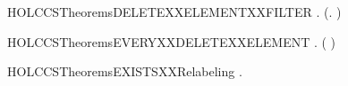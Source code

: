 \newcommand{\HOLCCSTheoremsDELETEXXELEMENTXXAPPEND}{\UseVerbatim{HOLCCSTheoremsDELETEXXELEMENTXXAPPEND}}
\begin{SaveVerbatim}{HOLCCSTheoremsDELETEXXELEMENTXXFILTER}
\HOLTokenTurnstile{} \HOLSymConst{\HOLTokenForall{}} .    \HOLSymConst{=}  (\HOLTokenLambda{}.  \HOLSymConst{\HOLTokenNotEqual{}} ) 
\end{SaveVerbatim}
\newcommand{\HOLCCSTheoremsDELETEXXELEMENTXXFILTER}{\UseVerbatim{HOLCCSTheoremsDELETEXXELEMENTXXFILTER}}
\begin{SaveVerbatim}{HOLCCSTheoremsEVERYXXDELETEXXELEMENT}
\HOLTokenTurnstile{} \HOLSymConst{\HOLTokenForall{}}  .   \HOLSymConst{\HOLTokenConj{}}   (  ) \HOLSymConst{\HOLTokenImp{}}   
\end{SaveVerbatim}
\newcommand{\HOLCCSTheoremsEVERYXXDELETEXXELEMENT}{\UseVerbatim{HOLCCSTheoremsEVERYXXDELETEXXELEMENT}}
\begin{SaveVerbatim}{HOLCCSTheoremsEXISTSXXRelabeling}
\HOLTokenTurnstile{} \HOLSymConst{\HOLTokenExists{}}.  
\end{SaveVerbatim}
\newcommand{\HOLCCSTheoremsEXISTSXXRelabeling}{\UseVerbatim{HOLCCSTheoremsEXISTSXXRelabeling}}
